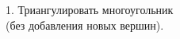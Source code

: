 \documentclass[preview]{standalone}
\begin{document}
\begin{center}
1. Триангулировать многоугольник\\(без добавления новых вершин).
\end{center}
\end{document}
